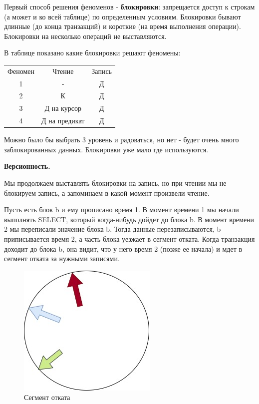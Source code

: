 Первый способ решения феноменов - \textbf{блокировки}: запрещается доступ к строкам (а может и ко всей таблице) по определенным условиям. Блокировки бывают длинные (до конца транзакций) и короткие (на время выполнения операции). Блокировки на несколько операций не выставляются. 

В таблице показано какие блокировки решают феномены:

\begin{center}
	\begin{tabular}{c|c c}
		Феномен & Чтение & Запись \\
		1 & - & Д \\
		2 & К & Д\\
		3 & Д на курсор & Д \\
		4 & Д на предикат & Д\\
	\end{tabular}
\end{center}

Можно было бы выбрать 3 уровень и радоваться, но нет - будет очень много заблокированных данных. Блокировки уже мало где используются. 

\textbf{Версионность.} 

Мы продолжаем выставлять блокировки на запись, но при чтении мы не блокируем запись, а запоминаем в какой момент произвели чтение. 

Пусть есть блок b и ему прописано время 1. В момент времени 1 мы начали выполнять SELECT, который когда-нибудь дойдет до блока b. В момент времени 2 мы переписали значение блока b. Тогда данные перезаписываются, b приписывается время 2, а часть блока уезжает в сегмент отката. Когда транзакция доходит до блока b, она видит, что у него время 2 (позже ее начала) и мдет в сегмент отката за нужными записями. 

\begin{figure}[H]
	\centering
	\includegraphics[scale = 0.5]{6/vers.jpg}
	\caption{Сегмент отката}
	\label{fig:vers}
	
\end{figure}

